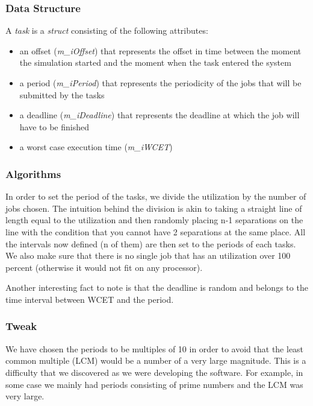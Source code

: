 \documentclass[11pt, a4paper,titlepage]{article}
\begin{document}
\subsubsection{Data Structure}  

A \emph{task} is a \emph{struct} consisting of the following attributes:
\begin{itemize}
\item an offset (\emph{m\_iOffset}) that represents the offset in time between the moment the simulation started and the moment when the task entered the system
\item a period (\emph{m\_iPeriod}) that represents the periodicity of the jobs that will be submitted by the tasks
\item a deadline (\emph{m\_iDeadline}) that represents the deadline at which the job will have to be finished
\item a worst case execution time (\emph{m\_iWCET})
\end{itemize}

\subsubsection{Algorithms}

In order to set the period of the tasks, we divide the utilization by the number of jobs chosen. The intuition behind the division is akin to taking a straight line of length equal to the utilization and then randomly placing n-1 separations on the line with the condition that you cannot have 2 separations at the same place. All the intervals now defined (n of them) are then set to the periods of each tasks. We also make sure that there is no single job that has an utilization over 100 percent (otherwise it would not fit on any processor). 

Another interesting fact to note is that the deadline is random and belongs to the time interval between WCET and the period.

\subsubsection{Tweak}

We have chosen the periods to be multiples of 10 in order to avoid that the least common multiple (LCM) would be a number of a very large magnitude. This is a difficulty that we discovered as we were developing the software. For example, in some case we mainly had periods consisting of prime numbers and the LCM was very large. 
\end{document}
